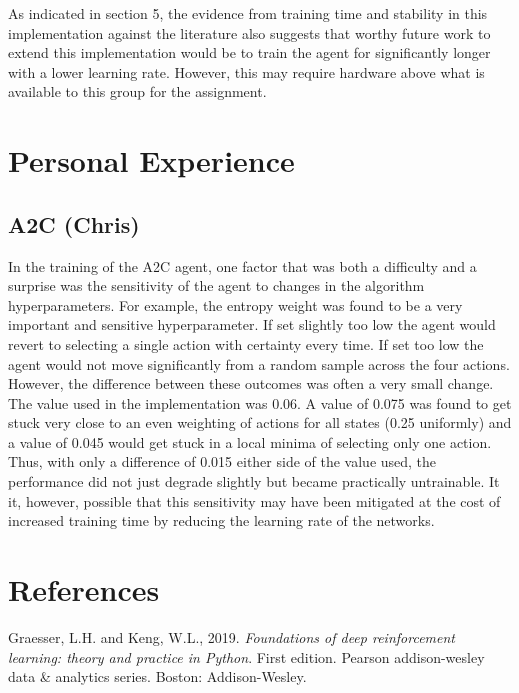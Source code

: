 \documentclass{article}
\begin{document}
As indicated in section 5, the evidence from training time and stability in this implementation against the literature also suggests that worthy future work to extend this implementation would be to train the agent for significantly longer with a lower learning rate. However, this may require hardware above what is available to this group for the assignment.

\section{Personal Experience}

\subsection{A2C (Chris)}

In the training of the A2C agent, one factor that was both a difficulty and a surprise was the sensitivity of the agent to changes in the algorithm hyperparameters. For example, the entropy weight was found to be a very important and sensitive hyperparameter. If set slightly too low the agent would revert to selecting a single action with certainty every time. If set too low the agent would not move significantly from a random sample across the four actions. However, the difference between these outcomes was often a very small change. The value used in the implementation was 0.06. A value of 0.075 was found to get stuck very close to an even weighting of actions for all states (0.25 uniformly) and a value of 0.045 would get stuck in a local minima of selecting only one action. Thus, with only a difference of 0.015 either side of the value used, the performance did not just degrade slightly but became practically untrainable. It it, however, possible that this sensitivity may have been mitigated at the cost of increased training time by reducing the learning rate of the networks.

\section*{References}



Graesser, L.H. and Keng, W.L., 2019. \emph{Foundations of deep reinforcement learning: theory and practice in Python}. First edition. Pearson addison-wesley data \& analytics series. Boston: Addison-Wesley.
\end{document}
